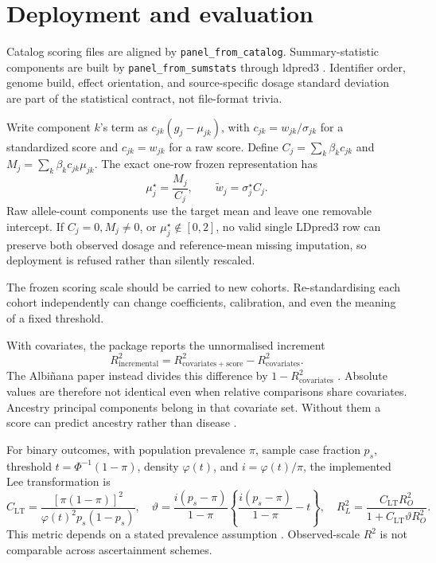 \documentclass[11pt,a4paper]{article}
\newcommand{\Rtwo}{\(R^2\)}
\begin{document}
\section{Deployment and evaluation}
\label{sec:deploy}

Catalog scoring files are aligned by
\texttt{panel\allowbreak\_from\allowbreak\_catalog}.
Summary-statistic components are built by
\texttt{panel\allowbreak\_from\allowbreak\_sumstats} through
ldpred3 \cite{prive2020}. Identifier order, genome build, effect
orientation, and source-specific dosage standard deviation are
part of the statistical contract, not file-format trivia.

Write component \(k\)'s term as \(c_{jk}(g_j-\mu_{jk})\), with
\(c_{jk}=w_{jk}/\sigma_{jk}\) for a standardized score and
\(c_{jk}=w_{jk}\) for a raw score. Define
\(C_j=\sum_k\beta_k c_{jk}\) and
\(M_j=\sum_k\beta_k c_{jk}\mu_{jk}\). The exact one-row frozen
representation has
\begin{equation}
  \mu_j^\star=\frac{M_j}{C_j},\qquad
  \widetilde w_j=\sigma_j^\star C_j .
  \label{eq:frozen-weights}
\end{equation}
Raw allele-count components use the target mean and leave one
removable intercept. If \(C_j=0,M_j\ne0\), or
\(\mu_j^\star\notin[0,2]\), no valid single LDpred3 row can
preserve both observed dosage and reference-mean missing
imputation, so deployment is refused rather than silently
rescaled.

The frozen scoring scale should be carried to new cohorts.
Re-standardising each cohort independently can change
coefficients, calibration, and even the meaning of a fixed
threshold.

With covariates, the package reports the unnormalised increment
\begin{equation}
  R^2_{\mathrm{incremental}}
  =R^2_{\mathrm{covariates+score}}-R^2_{\mathrm{covariates}}.
  \label{eq:incremental-r2}
\end{equation}
The Albi\~nana paper instead divides this difference by
\(1-R^2_{\mathrm{covariates}}\) \cite{albinana2023}. Absolute
values are therefore not identical even when relative
comparisons share covariates. Ancestry principal components
belong in that covariate set. Without them a score can predict
ancestry rather than disease \cite{wray2013}.

For binary outcomes, with population prevalence \(\pi\), sample
case fraction \(p_s\), threshold \(t=\Phi^{-1}(1-\pi)\), density
\(\varphi(t)\), and \(i=\varphi(t)/\pi\), the implemented Lee
transformation is
\begin{equation}
  C_{\mathrm{LT}}=
  \frac{[\pi(1-\pi)]^2}{\varphi(t)^2p_s(1-p_s)},
  \quad
  \vartheta=
  \frac{i(p_s-\pi)}{1-\pi}
  \left\{\frac{i(p_s-\pi)}{1-\pi}-t\right\},
  \quad
  R_L^2=
  \frac{C_{\mathrm{LT}}R_O^2}
       {1+C_{\mathrm{LT}}\vartheta R_O^2}.
  \label{eq:liability-r2}
\end{equation}
This metric depends on a stated prevalence assumption
\cite{lee2012}. Observed-scale \Rtwo{} is not comparable across
ascertainment schemes.
\end{document}
